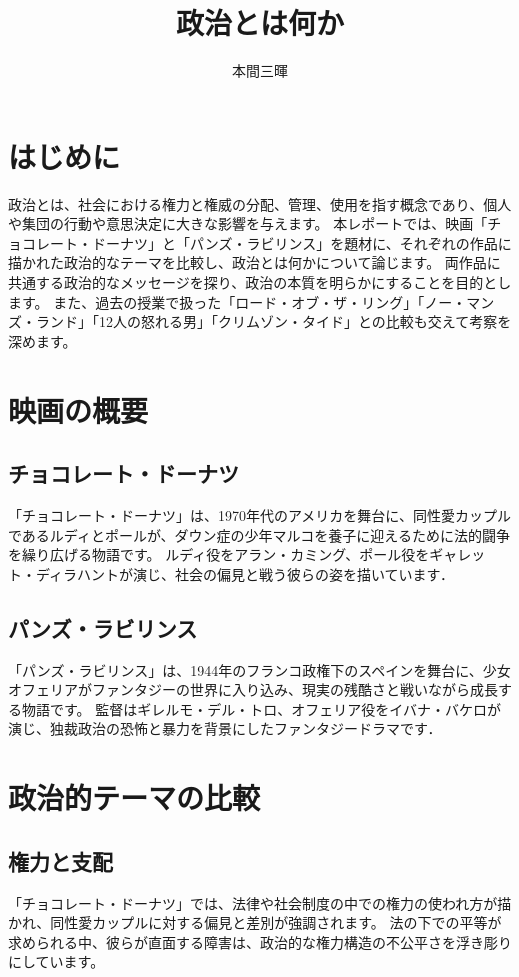 \documentclass[titlepage,a4paper]{jsarticle}
\title{政治とは何か}
\author{本間三暉}
\begin{document}
\maketitle
\section{はじめに}
政治とは、社会における権力と権威の分配、管理、使用を指す概念であり、個人や集団の行動や意思決定に大きな影響を与えます。
本レポートでは、映画「チョコレート・ドーナツ」と「パンズ・ラビリンス」を題材に、それぞれの作品に描かれた政治的なテーマを比較し、政治とは何かについて論じます。
両作品に共通する政治的なメッセージを探り、政治の本質を明らかにすることを目的とします。
また、過去の授業で扱った「ロード・オブ・ザ・リング」「ノー・マンズ・ランド」「12人の怒れる男」「クリムゾン・タイド」との比較も交えて考察を深めます。
\section{映画の概要}
\subsection{チョコレート・ドーナツ}
「チョコレート・ドーナツ」は、1970年代のアメリカを舞台に、同性愛カップルであるルディとポールが、ダウン症の少年マルコを養子に迎えるために法的闘争を繰り広げる物語です。
ルディ役をアラン・カミング、ポール役をギャレット・ディラハントが演じ、社会の偏見と戦う彼らの姿を描いています．
\subsection{パンズ・ラビリンス}
「パンズ・ラビリンス」は、1944年のフランコ政権下のスペインを舞台に、少女オフェリアがファンタジーの世界に入り込み、現実の残酷さと戦いながら成長する物語です。
監督はギレルモ・デル・トロ、オフェリア役をイバナ・バケロが演じ、独裁政治の恐怖と暴力を背景にしたファンタジードラマです．
\section{政治的テーマの比較}
\subsection{権力と支配}
「チョコレート・ドーナツ」では、法律や社会制度の中での権力の使われ方が描かれ、同性愛カップルに対する偏見と差別が強調されます。
法の下での平等が求められる中、彼らが直面する障害は、政治的な権力構造の不公平さを浮き彫りにしています。
\end{document}
